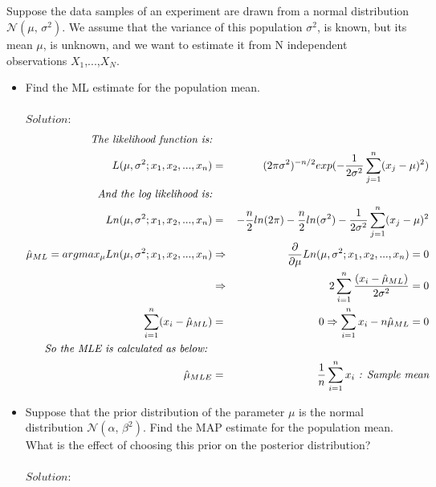 \documentclass[a4paper]{article}
\begin{document}
        \subsection{}
       Suppose the data samples of an experiment are drawn from a normal distribution $\mathcal{N}(\mu,\,\sigma^{2})$. We assume that the variance of this population $\sigma^{2}$, is known, but its mean $\mu$, is unknown, and we want to estimate it from N independent observations $X_{1}$,...,$X_{N}$.
        \begin{itemize}
        \item Find the ML estimate for the population mean.\\
        \\
        $Solution:$ \\
        \begin{eqnarray*}
            \emph{The likelihood function is:}\\
            L(\mu, \sigma^2; {x_1}, {x_2}, ..., {x_n}) &=& {(2\pi \sigma^2)^{-n/2}}exp(-\frac{1}{2{\sigma^2}}\sum_{j=1}^n({x_j}-\mu)^2) \\
            \emph{And the log likelihood is:} \\
            Ln(\mu, \sigma^2; {x_1}, {x_2}, ..., {x_n}) &=& -\frac{n}{2}ln(2\pi) -\frac{n}{2}ln(\sigma^2) - \frac{1}{2{\sigma^2}}\sum_{j=1}^n({x_j}-\mu)^2\\
            \hat{\mu}_{ML} = arg max_\mu \emph{} Ln(\mu, \sigma^2; {x_1}, {x_2}, ..., {x_n}) &\Rightarrow& \frac{\partial}{\partial \mu} Ln(\mu, \sigma^2; {x_1}, {x_2}, ..., {x_n}) = 0 \\
            &\Rightarrow& 2\sum_{i=1}^n \frac{({x_i} - \hat{\mu}_{ML})}{2\sigma^2} = 0 \\
            \sum_{i=1}^n ({x_i} - \hat{\mu}_{ML}) &=& 0 \Rightarrow \sum_{i=1}^n {x_i} - n\hat{\mu}_{ML} = 0 \\
            \emph{So the MLE is calculated as below: } \\
            \hat{\mu}_{MLE} &=& \frac{1}{n} \sum_{i=1}^n {x_i}\emph{ : Sample mean}
        \end{eqnarray*}
        \item Suppose that the prior distribution of the parameter $\mu$ is the normal distribution $\mathcal{N}(\alpha,\,\beta^{2})$. Find the MAP estimate for the population mean. What is the effect of choosing this prior on the posterior distribution?\\
        \\
        $Solution:$ \\

\end{itemize}
\end{document}
